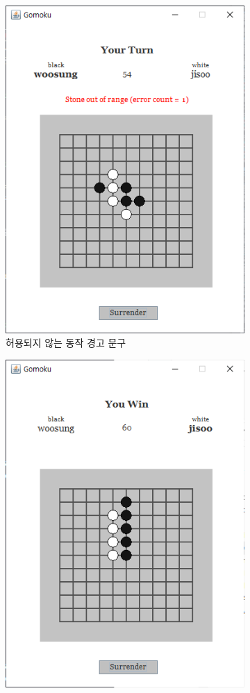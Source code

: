 \documentclass[a4paper, 10pt]{article}
\begin{document}
\begin{figure}[h]
\begin{subfigure}{.3\textwidth}
    \includegraphics[width=.9\linewidth]{resource/out_of_board}
    \caption{허용되지 않는 동작 경고 문구}
    \label{fig:room}
  \end{subfigure}
  \begin{subfigure}{.3\textwidth}
    \centering
    \includegraphics[width=.9\linewidth]{resource/win}

\end{subfigure}
\end{figure}
\end{document}
